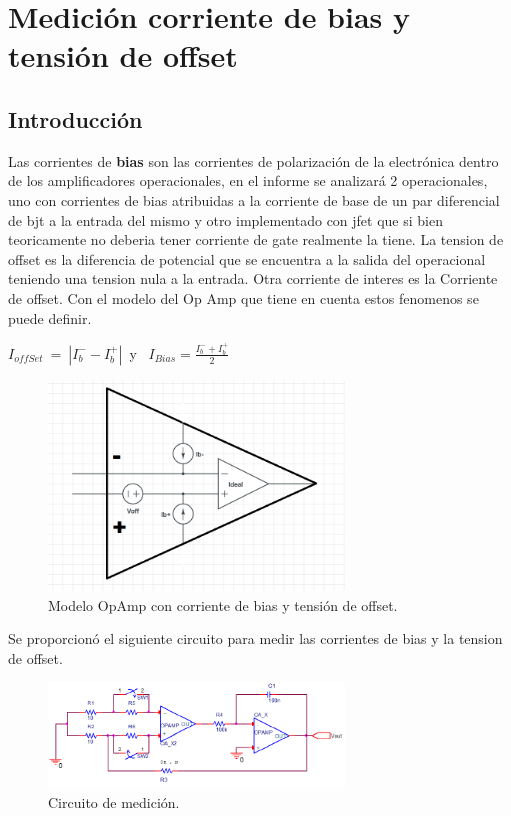 
\section{Medici\'on corriente de bias y tensi\'on de offset}

\subsection{Introducción}
Las corrientes de \textbf{bias} son las corrientes de polarización de la electrónica dentro de los amplificadores operacionales, en el informe se analizará 2 operacionales, uno con corrientes de bias atribuidas a la corriente de base de un par diferencial de bjt a la entrada del mismo y otro implementado con jfet que si bien teoricamente no deberia tener corriente de gate realmente la tiene.
La tension de offset es la diferencia de potencial que se encuentra a la salida del operacional teniendo una tension nula a la entrada.
Otra corriente de interes es la Corriente de offset.
Con el modelo del Op Amp que tiene en cuenta estos fenomenos se puede definir.\newline
 	
 $I_{offSet} \ = \ |I_b^{-}-I_b^{+}|$\ y \ $I_{Bias}= \frac{I_b^-+I_b^{+}}{2}$
\begin{figure}[htb]	
	\centering
	\includegraphics[width=0.7\textwidth]{imagenes/opampReal.PNG}
	\caption{Modelo OpAmp con corriente de bias y tensión de offset.}
	\label{fig:OpampBias}
\end{figure}



Se proporcionó el siguiente circuito para medir las corrientes de bias y la tension de offset.

\begin{figure}[htb]	
	\centering
	\includegraphics[width=0.7\textwidth]{imagenes/CircMedicion.PNG}
	\caption{Circuito de medición.}
	\label{fig:CircMedicion}
\end{figure}

